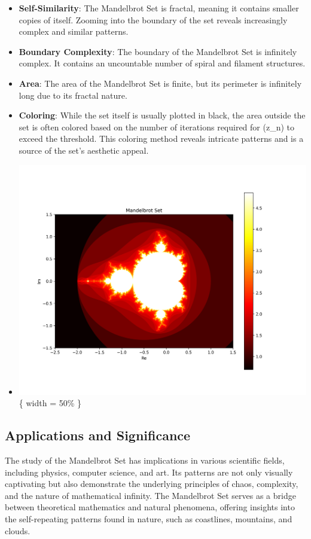 \documentclass[
]{article}
\providecommand{\tightlist}{%
  \setlength{\itemsep}{0pt}\setlength{\parskip}{0pt}}
\def\tightlist{}
\begin{document}
\begin{itemize}
\tightlist
\item
  \textbf{Self-Similarity}: The Mandelbrot Set is fractal, meaning it
  contains smaller copies of itself. Zooming into the boundary of the
  set reveals increasingly complex and similar patterns.
\item
  \textbf{Boundary Complexity}: The boundary of the Mandelbrot Set is
  infinitely complex. It contains an uncountable number of spiral and
  filament structures.
\item
  \textbf{Area}: The area of the Mandelbrot Set is finite, but its
  perimeter is infinitely long due to its fractal nature.
\item
  \textbf{Coloring}: While the set itself is usually plotted in black,
  the area outside the set is often colored based on the number of
  iterations required for (z\_n) to exceed the threshold. This coloring
  method reveals intricate patterns and is a source of the set's
  aesthetic appeal.
\item
  \includegraphics{mandelbrot.png}\{ width = 50\% \}
\end{itemize}

\subsection{Applications and
Significance}\label{applications-and-significance}

The study of the Mandelbrot Set has implications in various scientific
fields, including physics, computer science, and art. Its patterns are
not only visually captivating but also demonstrate the underlying
principles of chaos, complexity, and the nature of mathematical
infinity. The Mandelbrot Set serves as a bridge between theoretical
mathematics and natural phenomena, offering insights into the
self-repeating patterns found in nature, such as coastlines, mountains,
and clouds.
\end{document}
